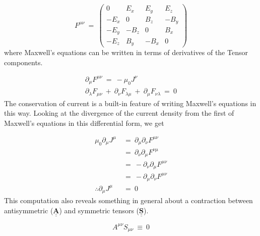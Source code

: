 \begin{equation}
  F^{\mu\nu}\ =\
  \begin{pmatrix}
    0 & E_x & E_y & E_z \\
    -E_x & 0 & B_z & -B_y \\
    -E_y & -B_z & 0 & B_x \\
    -E_z & B_y & -B_x & 0 
  \end{pmatrix}
\end{equation}
where Maxwell's equations can be written in terms of derivatives of the Tensor components.

\begin{gather}
  \partial_{\mu}F^{\mu\nu}\ =\ -\mu_0J^{\nu} \\
  \partial_{\lambda}F_{\mu\nu}\ +\ \partial_{\nu}F_{\lambda\mu}\ +\ \partial_{\mu}F_{\nu\lambda}\ =\ 0
\end{gather}
The conservation of current is a built-in feature of writing Maxwell's equations in this way.  Looking at the divergence of the current density from the first of Maxwell's equations in this differential form, we get

\begin{equation}
  \begin{aligned}
    \mu_0\partial_{\mu}J^{\mu}\ &=\ \partial_{\mu}\partial_{\nu}F^{\mu\nu} \\
    &=\ \partial_{\nu}\partial_{\mu}F^{\nu\mu} \\
    &=\ -\partial_{\nu}\partial_{\mu}F^{\mu\nu} \\
    &=\ -\partial_{\mu}\partial_{\nu}F^{\mu\nu} \\
    \therefore \partial_{\mu}J^{\mu}\ &=\ 0
  \end{aligned}
\end{equation}
This computation also reveals something in general about a contraction between antisymmetric ($\underline{\underline{\mathbf{A}}}$) and symmetric tensors ($\underline{\underline{\mathbf{S}}}$).

\begin{equation}
  A^{\mu\nu}S_{\mu\nu}\ \equiv\ 0
\end{equation}
